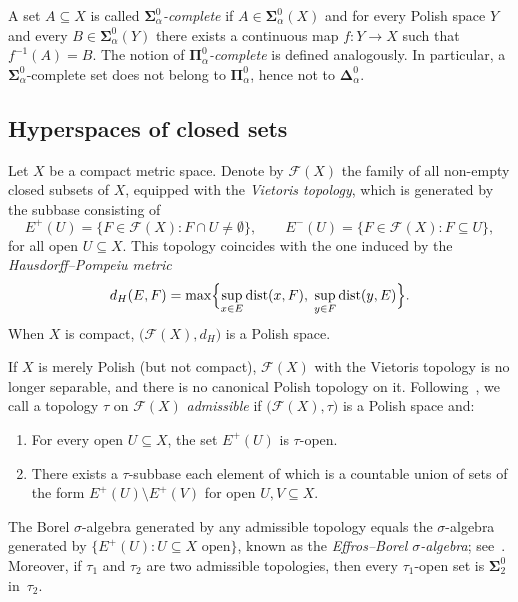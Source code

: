 \documentclass[12pt]{amsart}
\theoremstyle{plain}
\theoremstyle{definition}
\theoremstyle{remark}
\DeclareMathOperator{\dist}{dist}
\begin{document}
A set $A \subseteq X$ is called
\emph{$\boldsymbol{\Sigma}^0_\alpha$-complete} if
$A \in \boldsymbol{\Sigma}^0_\alpha(X)$ and for every Polish space $Y$ and every
$B \in \boldsymbol{\Sigma}^0_\alpha(Y)$ there exists a continuous map
$f \colon Y \to X$ such that $f^{-1}(A) = B$.  The notion of
\emph{$\boldsymbol{\Pi}^0_\alpha$-complete} is defined analogously.
In particular, a $\boldsymbol{\Sigma}^0_\alpha$-complete set does not belong to
$\boldsymbol{\Pi}^0_\alpha$, hence not to $\boldsymbol{\Delta}^0_\alpha$.

\subsection{Hyperspaces of closed sets}\label{subsec:hyper}

Let $X$ be a compact metric space.  Denote by $\mathcal{F}(X)$ the family of
all non-empty closed subsets of $X$, equipped with the \emph{Vietoris topology},
which is generated by the subbase consisting of
\[
    E^+(U) = \{F \in \mathcal{F}(X) \colon F \cap U \neq \emptyset\}, \qquad
    E^-(U) = \{F \in \mathcal{F}(X) \colon F \subseteq U\},
\]
for all open $U \subseteq X$.  This topology coincides with the one induced by
the \emph{Hausdorff--Pompeiu metric}
\[
    d_H(E,F) = \max\Bigl\{\sup_{x \in E}\dist(x,F),\;\sup_{y \in F}\dist(y,E)\Bigr\}.
\]
When $X$ is compact, $\bigl(\mathcal{F}(X), d_H\bigr)$ is a Polish space.

If $X$ is merely Polish (but not compact), $\mathcal{F}(X)$ with the Vietoris
topology is no longer separable, and there is no canonical Polish topology on it.
Following~\cite{God2018Cod}, we call a topology $\tau$ on $\mathcal{F}(X)$
\emph{admissible} if $\bigl(\mathcal{F}(X), \tau\bigr)$ is a Polish space and:
\begin{enumerate}[label=(A\arabic*)]
    \item\label{A1} For every open $U \subseteq X$, the set $E^+(U)$ is
      $\tau$-open.
    \item\label{A2} There exists a $\tau$-subbase each element of which is a
      countable union of sets of the form $E^+(U) \setminus E^+(V)$ for open
      $U, V \subseteq X$.
\end{enumerate}
The Borel $\sigma$-algebra generated by any admissible topology equals the
$\sigma$-algebra generated by $\{E^+(U) \colon U \subseteq X \text{ open}\}$,
known as the \emph{Effros--Borel $\sigma$-algebra};
see~\cite[Section~2]{God2018Cod}.
Moreover, if $\tau_1$ and $\tau_2$ are two admissible topologies, then every
$\tau_1$-open set is $\boldsymbol{\Sigma}^0_2$ in~$\tau_2$.
\end{document}

